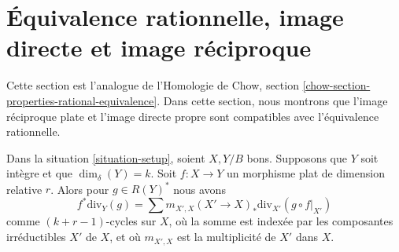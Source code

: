 \section{Équivalence rationnelle, image directe et image réciproque}
\label{section-properties-rational-equivalence}

\noindent
Cette section est l'analogue de l'Homologie de Chow, section
\ref{chow-section-properties-rational-equivalence}. Dans cette section, nous
montrons que l'image réciproque plate et l'image directe propre sont
compatibles avec l'équivalence rationnelle.

\begin{lemma}
\label{lemma-prepare-flat-pullback-rational-equivalence}
Dans la situation \ref{situation-setup}, soient $X, Y/B$ bons. Supposons
que $Y$ soit intègre et que $\dim_\delta(Y) = k$. Soit $f : X \to Y$ un morphisme
plat de dimension relative $r$. Alors pour $g \in R(Y)^*$ nous avons
$$
f^*\text{div}_Y(g) =
\sum m_{X', X} (X' \to X)_*\text{div}_{X'}(g \circ f|_{X'})
$$
comme $(k + r - 1)$-cycles sur $X$, où la somme est indexée par les composantes
irréductibles $X'$ de $X$, et où $m_{X', X}$ est la multiplicité de $X'$ dans $X$.
\end{lemma}

